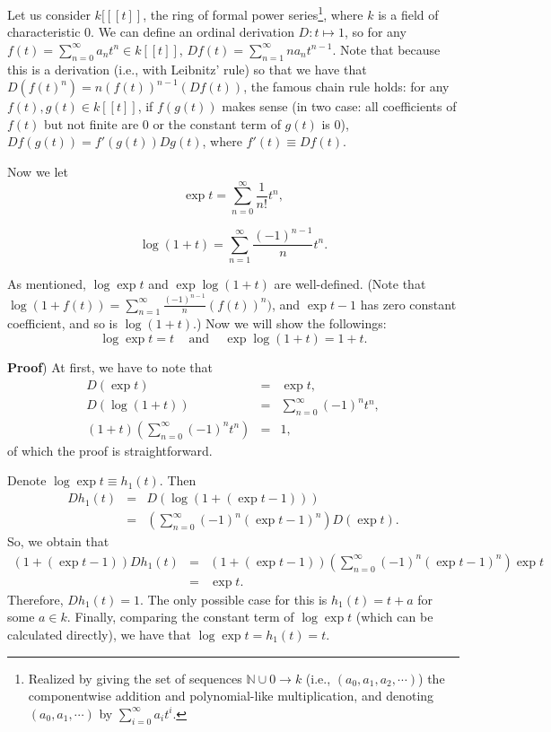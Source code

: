\documentclass{article}
\begin{document}
Let us consider $k[[[t]]$, the ring of formal power series\footnote{Realized by giving the set of sequences $\mathbb{N} \cup {0} \to k$ (i.e., $(a_0, a_1, a_2, \cdots)$) the componentwise addition and polynomial-like multiplication, and denoting $(a_0, a_1, \cdots)$ by $\sum_{i = 0}^\infty a_i t^i$.}, where $k$ is a field of characteristic 0.
We can define an ordinal derivation $D : t \mapsto 1$, so for any $f(t) = \sum_{n = 0}^\infty a_n t^n \in k[[t]]$, $Df(t) = \sum_{n = 1}^\infty n a_n t^{n - 1}$.
Note that because this is a derivation (i.e., with Leibnitz' rule) so that we have that $D(f(t)^n) = n(f(t))^{n - 1} (Df(t))$, the famous chain rule holds: for any $f(t), g(t) \in k[[t]]$, if $f(g(t))$ makes sense (in two case: all coefficients of $f(t)$ but not finite are 0 or the constant term of $g(t)$ is 0), $Df(g(t)) = f'(g(t)) Dg(t)$, where $f'(t) \equiv Df(t)$.

Now we let 
\begin{displaymath}
\exp{t} = \sum_{n = 0}^\infty \frac{1}{n!} t^n, 
\end{displaymath} 

\begin{displaymath}
\log{(1 + t)} = \sum_{n = 1}^\infty \frac{(-1)^{n - 1}}{n} t^n.
\end{displaymath}

As mentioned, $\log{\exp{t}}$ and $\exp{\log{(1 + t)}}$ are well-defined.
(Note that $\log{(1 + f(t))} = \sum_{n = 1}^\infty \frac{(-1)^{n - 1}}{n} (f(t))^n)$, and $\exp{t} - 1$ has zero constant coefficient, and so is $\log{(1 + t)}$.)
Now we will show the followings: 
\begin{displaymath}
\log{\exp{t}} = t \;\;\; \textrm{ and } \;\;\; \exp{\log{(1 + t)}} = 1 + t.
\end{displaymath}

\textbf{Proof}) 
At first, we have to note that 
\begin{eqnarray*}
D(\exp{t}) &=& \exp{t}, \\ 
D(\log{(1 + t)}) &=& \sum_{n = 0}^\infty (-1)^n t^n, \\
(1 + t) \left( \sum_{n = 0}^\infty (-1)^n t^n \right) &=& 1,
\end{eqnarray*}
of which the proof is straightforward.

Denote $\log{\exp{t}} \equiv h_1(t)$.
Then 
\begin{eqnarray*}
  Dh_1(t) &=& D(\log{(1 + (\exp{t} - 1))}) \\ 
    &=& \left( \sum_{n = 0}^\infty (-1)^n (\exp{t} - 1)^n \right) D(\exp{t}).
\end{eqnarray*}
So, we obtain that 
\begin{eqnarray*}
  (1 + (\exp{t} - 1)) Dh_1(t) &=& (1 + (\exp{t} - 1)) \left( \sum_{n = 0}^\infty (-1)^n (\exp{t} - 1)^n \right) \exp{t} \\
    &=& \exp{t}.
\end{eqnarray*}
Therefore, $Dh_1(t) = 1$.
The only possible case for this is $h_1(t) = t + a$ for some $a \in k$.
Finally, comparing the constant term of $\log{\exp{t}}$ (which can be calculated directly), we have that $\log{\exp{t}} = h_1(t) = t$.
\end{document}
